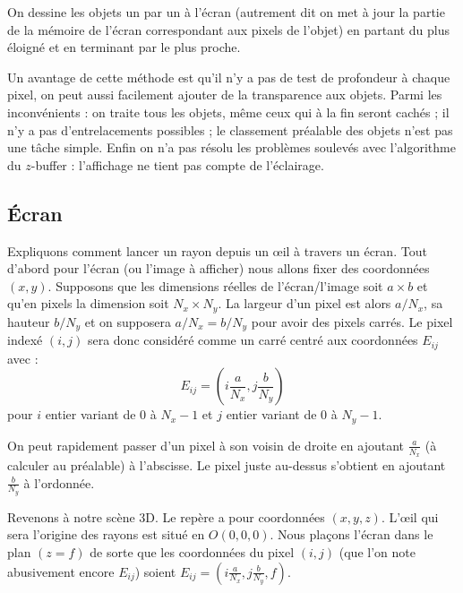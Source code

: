 \documentclass[11pt,class=report,crop=false]{standalone}
\begin{document}

On dessine les objets un par un à l'écran (autrement dit on met à jour la partie de la mémoire de l'écran correspondant aux pixels de l'objet) en partant du plus éloigné et en terminant par le plus proche.


Un avantage de cette méthode est qu'il n'y a pas de test de profondeur à chaque pixel, on peut aussi facilement ajouter de la transparence aux objets.
Parmi les inconvénients :
on traite tous les objets, même ceux qui à la fin seront cachés ;
il n'y a pas d'entrelacements possibles ;
le classement préalable des objets n'est pas une tâche simple.
Enfin on n'a pas résolu les problèmes soulevés avec l'algorithme du $z$-buffer : l'affichage ne tient pas compte de l'éclairage.

\subsection{Écran}


Expliquons comment lancer un rayon depuis un \oe il à travers un écran.
Tout d'abord pour l'écran (ou l'image à afficher) nous allons fixer des coordonnées $(x,y)$. 
Supposons que les dimensions réelles de l'écran/l'image soit $a \times b$
et qu'en pixels la dimension soit $N_x \times N_y$. La largeur d'un pixel est alors $a/N_x$, sa hauteur $b/N_y$ et on supposera $a/N_x = b/N_y$ pour avoir des pixels carrés.
Le pixel indexé $(i,j)$ sera donc considéré comme un carré centré aux coordonnées $E_{ij}$ avec :
$$E_{ij} = \left( i \frac{a}{N_x}, j \frac{b}{N_y} \right)$$
pour $i$ entier variant de $0$ à $N_x-1$ et $j$ entier variant de $0$ à $N_y-1$.


On peut rapidement passer d'un pixel à son voisin de droite en ajoutant $\frac{a}{N_x}$ (à calculer au préalable) à l'abscisse. Le pixel juste au-dessus s'obtient en ajoutant $\frac{b}{N_y}$ à l'ordonnée.

Revenons à notre scène 3D. Le repère a pour coordonnées $(x,y,z)$. 
L'\oe{}il qui sera l'origine des rayons est situé en $O(0,0,0)$. 
Nous plaçons l'écran dans le plan $(z=f)$ de sorte que les coordonnées du pixel $(i,j)$ (que l'on note abusivement encore $E_{ij}$) soient $E_{ij} = \left( i \frac{a}{N_x}, j \frac{b}{N_y}, f \right)$.
\end{document}
